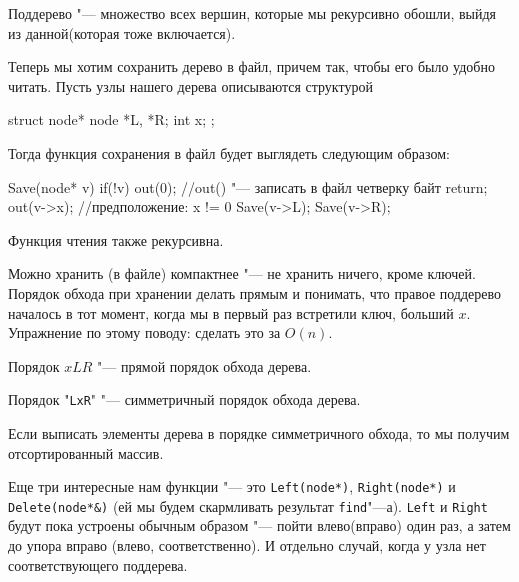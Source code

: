 \begin{Def}
	Поддерево "--- множество всех вершин, которые мы рекурсивно обошли, 
	выйдя из данной(которая тоже включается).
\end{Def}

Теперь мы хотим сохранить дерево в файл, причем так, чтобы его было удобно читать.
Пусть узлы нашего дерева описываются структурой
\begin{cppcode}
struct node* {
    node *L, *R;
    int x;
};
\end{cppcode}
Тогда функция сохранения в файл будет выглядеть следующим образом:
\begin{cppcode}
Save(node* v) {
    if(!v) {
        out(0); //out() "--- записать в файл четверку байт
        return;
    }
    out(v->x); //предположение: x != 0
    Save(v->L);
    Save(v->R);
}
\end{cppcode}
Функция чтения также рекурсивна.

Можно хранить (в файле) компактнее "--- не хранить ничего, кроме ключей. 
Порядок обхода при хранении делать прямым и понимать, что правое поддерево 
началось в тот момент, когда мы в первый раз встретили ключ, больший $x$.
Упражнение по этому поводу: сделать  это за $O(n)$.

\begin{Def}
	Порядок $xLR$ "--- прямой порядок обхода дерева.
	
	Порядок "\texttt{LxR}" "--- симметричный порядок обхода дерева.
\end{Def}

\begin{Rem}
	Если выписать элементы дерева в порядке симметричного обхода, 
	то мы получим отсортированный массив.
\end{Rem}

Еще три интересные нам функции "--- это \texttt{Left(node*)}, \texttt{Right(node*)} 
и \texttt{Delete(node*\&)} 
(ей мы будем скармливать результат \texttt{find}"---а). 
\texttt{Left} и \texttt{Right} будут пока устроены обычным образом "--- 
пойти влево(вправо) один раз, а затем до упора вправо (влево, соответственно). 
И отдельно случай, когда у узла нет соответствующего поддерева.

